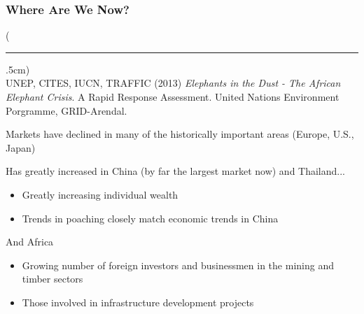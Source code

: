 \documentclass[10pt]{beamer}
\newenvironment{reference}[2]{%
	\begin{textblock*}{\textwidth}(#1,#2)
		\tiny\bgroup\color{gray}}{\egroup\end{textblock*}}
\begin{document}
\begin{frame}[t]
\frametitle{Where Are We Now?}
\vspace{0.5cm}
	
	\begin{reference}{4mm}{90mm}
		\rule{1.5cm}{0.25pt}\\
		UNEP, CITES, IUCN, TRAFFIC (2013) \emph{Elephants in the Dust - The African Elephant Crisis}. A Rapid Response Assessment. United Nations Environment Porgramme, GRID-Arendal. 
	\end{reference}
	
	Markets have declined in many of the historically important areas (Europe, U.S., Japan)
	
	\bigskip
	
	Has greatly increased in China (by far the largest market now) and Thailand...
	\smallskip
		\begin{itemize}
			\item Greatly increasing individual wealth
			\smallskip
			\item Trends in poaching closely match economic trends in China
		\end{itemize}
	\bigskip
	
	And Africa
	\smallskip
		\begin{itemize}
			\item Growing number of foreign investors and businessmen in the mining and timber sectors
			\smallskip
			\item Those involved in infrastructure development projects
		\end{itemize}
\end{frame}
\end{document}
